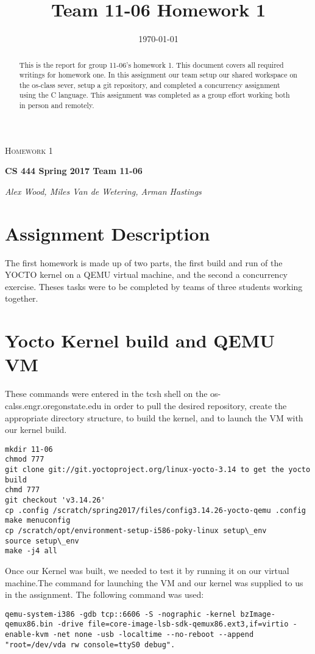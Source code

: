 \documentclass[letterpaper,10pt,draftclsnofoot,onecolumn]{IEEEtran}
\title{Team 11-06 Homework 1}
\def\name{Alex Wood, Miles Van de Wetering, Arman Hastings}
\begin{document}
\begin{titlepage}
   \centering
	{\scshape\Large Homework 1\par}
	\vspace{1.5cm}
	{\huge\bfseries CS 444 Spring 2017 Team 11-06\par}
	\vspace{2cm}
	{\Large\itshape \name \par}
    
    \date{\today}
    
    \vspace{2cm}
    
    \begin{abstract}
 	This is the report for group 11-06's homework 1. This document covers all required writings for homework one. In this assignment our team setup our shared workspace on the os-class sever, setup a git repository, and completed a concurrency assignment using the C language. This assignment was completed as a group effort working both in person and remotely.
   \end{abstract}
      
\end{titlepage}

\tableofcontents

\newpage

\section{Assignment Description}
The first homework is made up of two parts, the first build and run of the YOCTO kernel on a QEMU virtual machine, and the second a concurrency exercise. Theses tasks were to be completed by teams of three students working together. 
\section{Yocto Kernel build and QEMU VM}
These commands were entered in the tcsh shell on the os-calss.engr.oregonstate.edu in order to pull the desired repository, create the appropriate directory structure, to build the kernel, and to launch the VM with our kernel build. 

\begin{lstlisting}
mkdir 11-06
chmod 777
git clone git://git.yoctoproject.org/linux-yocto-3.14 to get the yocto build
chmd 777
git checkout 'v3.14.26'
cp .config /scratch/spring2017/files/config3.14.26-yocto-qemu .config
make menuconfig
cp /scratch/opt/environment-setup-i586-poky-linux setup\_env
source setup\_env
make -j4 all
\end{lstlisting}
Once our Kernel was built, we needed to test it by running it on our virtual machine.The command for launching the VM and our kernel was supplied to us in the assignment. The following command was used:  
\begin{lstlisting}
qemu-system-i386 -gdb tcp::6606 -S -nographic -kernel bzImage-qemux86.bin -drive file=core-image-lsb-sdk-qemux86.ext3,if=virtio -enable-kvm -net none -usb -localtime --no-reboot --append "root=/dev/vda rw console=ttyS0 debug".

\end{lstlisting}
\end{document}
